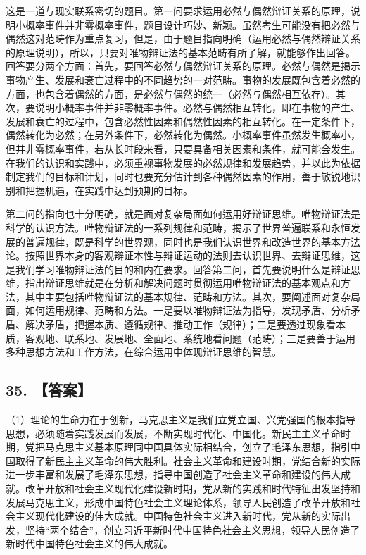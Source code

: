 \documentclass[UTF8,11pt]{ctexart}
\begin{document}
这是一道与现实联系密切的题目。第一问要求运用必然与偶然辩证关系的原理，说明小概率事件并非零概率事件，题目设计巧妙、新颖。虽然考生可能没有把必然与偶然这对范畴作为重点复习，但是，由于题目指向明确（运用必然与偶然辩证关系的原理说明），所以，只要对唯物辩证法的基本范畴有所了解，就能够作出回答。回答要分两个方面：首先，要回答必然与偶然辩证关系的原理。必然与偶然是揭示事物产生、发展和衰亡过程中的不同趋势的一对范畴。事物的发展既包含着必然的方面，也包含着偶然的方面，是必然与偶然的统一（必然与偶然相互依存）。其次，要说明小概率事件并非零概率事件。必然与偶然相互转化，即在事物的产生、发展和衰亡的过程中，包含必然性因素和偶然性因素的相互转化。在一定条件下，偶然转化为必然；在另外条件下，必然转化为偶然。小概率事件虽然发生概率小，但并非零概率事件，若从长时段来看，只要具备相关因素和条件，就可能会发生。在我们的认识和实践中，必须重视事物发展的必然规律和发展趋势，并以此为依据制定我们的目标和计划，同时也要充分估计到各种偶然因素的作用，善于敏锐地识别和把握机遇，在实践中达到预期的目标。


第二问的指向也十分明确，就是面对复杂局面如何运用好辩证思维。唯物辩证法是科学的认识方法。唯物辩证法的一系列规律和范畴，揭示了世界普遍联系和永恒发展的普遍规律，既是科学的世界观，同时也是我们认识世界和改造世界的基本方法论。按照世界本身的客观辩证本性与辩证运动的法则去认识世界、去辩证思维，这是我们学习唯物辩证法的目的和内在要求。回答第二问，首先要说明什么是辩证思维，指出辩证思维就是在分析和解决问题时贯彻运用唯物辩证法的基本观点和方法，其中主要包括唯物辩证法的基本规律、范畴和方法。其次，要阐述面对复杂局面，如何运用规律、范畴和方法。一是要以唯物辩证法为指导，发现矛盾、分析矛盾、解决矛盾，把握本质、遵循规律、推动工作（规律）；二是要透过现象看本质，客观地、联系地、发展地、全面地、系统地看问题（范畴）；三是要善于运用多种思想方法和工作方法，在综合运用中体现辩证思维的智慧。


\subsection*{35. 【答案】}

（1）理论的生命力在于创新，马克思主义是我们立党立国、兴党强国的根本指导思想，必须随着实践发展而发展，不断实现时代化、中国化。新民主主义革命时期，党把马克思主义基本原理同中国具体实际相结合，创立了毛泽东思想，指引中国取得了新民主主义革命的伟大胜利。社会主义革命和建设时期，党结合新的实际进一步丰富和发展了毛泽东思想，指导中国创造了社会主义革命和建设的伟大成就。改革开放和社会主义现代化建设新时期，党从新的实践和时代特征出发坚持和发展马克思主义，形成中国特色社会主义理论体系，领导人民创造了改革开放和社会主义现代化建设的伟大成就。中国特色社会主义进入新时代，党从新的实际出发，坚持“两个结合”，创立习近平新时代中国特色社会主义思想，领导人民创造了新时代中国特色社会主义的伟大成就。
\end{document}
